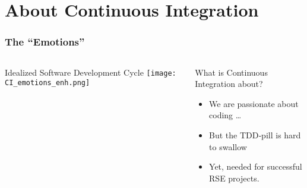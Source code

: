\section{About Continuous Integration}
{   
}

\begin{frame}
	\frametitle{The “Emotions”}
	\begin{columns}
		\begin{column}{0.5\textwidth}
			\centering 
			Idealized Software Development Cycle
			\texttt{[image: CI\_emotions\_enh.png]}
		\end{column}
		\begin{column}{0.5\textwidth}
			What is Continuous Integration about?
			\begin{itemize}[<+->]
				\item We are passionate about coding \ldots
				\item But the TDD‑pill is hard to swallow
				\item Yet, needed for successful RSE projects.
			\end{itemize}
		\end{column}
	\end{columns}
\end{frame}

